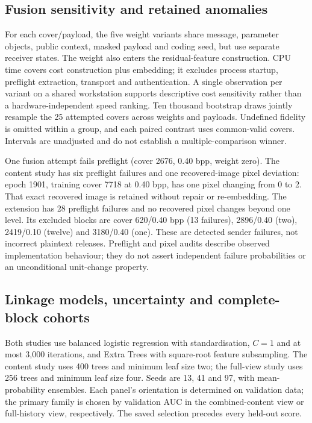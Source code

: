 \documentclass[journal]{IEEEtran}
\theoremstyle{definition}
\theoremstyle{game}
\begin{document}
\subsection{Fusion sensitivity and retained anomalies}
For each cover/payload, the five weight variants share message, parameter
objects, public context, masked payload and coding seed, but use separate
receiver states. The weight also enters the residual-feature construction.
CPU time covers cost construction plus embedding; it excludes process
startup, preflight extraction, transport and authentication. A single
observation per variant on a shared workstation supports descriptive
cost sensitivity rather than a hardware-independent speed ranking.
Ten thousand bootstrap draws jointly resample the 25 attempted covers
across weights and payloads. Undefined fidelity is omitted within a
group, and each paired contrast uses common-valid covers. Intervals
are unadjusted and do not establish a multiple-comparison winner.

One fusion attempt fails preflight (cover 2676, 0.40 bpp, weight zero).
The content study has six preflight failures and one recovered-image
pixel deviation: epoch 1901, training cover 7718 at 0.40 bpp, has one
pixel changing from 0 to 2. That exact recovered image is retained
without repair or re-embedding. The extension has 28 preflight failures
and no recovered pixel changes beyond one level. Its excluded blocks
are cover 620/0.40 bpp (13 failures), 2896/0.40 (two), 2419/0.10
(twelve) and 3180/0.40 (one). These are detected sender failures,
not incorrect plaintext releases. Preflight and pixel audits describe
observed implementation behaviour; they do not assert independent
failure probabilities or an unconditional unit-change property.

\subsection{Linkage models, uncertainty and complete-block cohorts}
Both studies use balanced logistic regression with standardisation,
$C=1$ and at most 3,000 iterations, and Extra Trees with square-root
feature subsampling. The content study uses 400 trees and minimum leaf
size two; the full-view study uses 256 trees and minimum leaf size four.
Seeds are 13, 41 and 97, with mean-probability ensembles. Each panel's
orientation is determined on validation data; the primary family is
chosen by validation AUC in the combined-content view or full-history
view, respectively. The saved selection precedes every held-out score.
\end{document}
